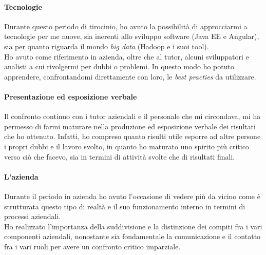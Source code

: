 \paragraph{Tecnologie}
Durante questo periodo di tirocinio, ho avuto la possibilità di approcciarmi a tecnologie per me nuove, sia inerenti allo sviluppo software (Java EE e Angular), sia per quanto riguarda il mondo \textit{big data} (Hadoop e i suoi tool). \\
Ho avuto come riferimento in azienda, oltre che al tutor, alcuni sviluppatori e analisti a cui rivolgermi per dubbi o problemi. In questo modo ho potuto apprendere, confrontandomi direttamente con loro, le \textit{best practies} da utilizzare.

\paragraph{Presentazione ed esposizione verbale}
Il confronto continuo con i tutor aziendali e il personale che mi circondava, mi ha permesso di farmi maturare nella produzione ed esposizione verbale dei risultati che ho ottenuto. Infatti, ho compreso quanto risulti utile esporre ad altre persone i propri dubbi e il lavoro svolto, in quanto ho maturato uno spirito più critico verso ciò che facevo, sia in termini di attività svolte che di risultati finali.

\paragraph{L'azienda}
Durante il periodo in azienda ho avuto l'occasione di vedere più da vicino come è strutturata questo tipo di realtà e il suo funzionamento interno in termini di processi aziendali. \\
Ho realizzato l'importanza della suddivisione e la distinzione dei compiti fra i vari componenti aziendali, nonostante sia fondamentale la comunicazione e il contatto fra i vari ruoli per avere un confronto critico imparziale.

